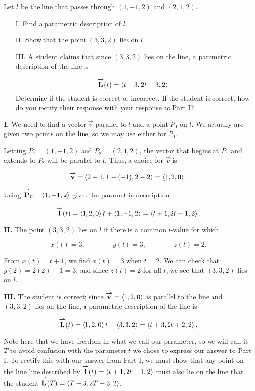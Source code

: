 \documentclass[noauthor, handout]{ximera}
\begin{document}

\begin{problem}
Let $l$ be the line that passes through $(1,-1,2)$ and $(2,1,2)$.

\begin{itemize}
\item[I.] Find a parametric description of $l$.
\item[II.] Show that the point $(3,3,2)$ lies on $l$.
\item[III.] A student claims that since $(3,3,2)$ lies on the line, a parametric description of the line is 

\[
{\overset{\boldsymbol{\rightharpoonup}}{\mathbf{L}}}(t) = \left\langle t+3,2t+3,2\right\rangle.
\]
Determine if the student is correct or incorrect.  If the student is correct, how do you rectify their response with your response to Part I?
\end{itemize} 

\begin{freeResponse}

\textbf{I.} We need to find a vector $\vec{v}$ parallel to $l$ and a point $P_0$ on $l$.  We actually are given two points on the line, so we may use either for $P_0$.  

Letting $P_1 = (1,-1,2)$ and $P_2 = (2,1,2)$, the vector that begins at $P_1$ and extends to $P_2$ will be parallel to $l$.  Thus, a choice for $\vec{v}$ is

\[
{\overset{\boldsymbol{\rightharpoonup}}{\mathbf{v}}} = \left\langle 2-1,1-(-1),2-2\right\rangle = \left\langle 1,2,0\right\rangle.
\]

Using ${\overset{\boldsymbol{\rightharpoonup}}{\mathbf{P}}}_0 = \left\langle 1,-1,2\right\rangle$ gives the parametric description

\[
{\overset{\boldsymbol{\rightharpoonup}}{\mathbf{l}}}(t) = \left\langle 1,2,0\right\rangle t+\left\langle 1,-1,2\right\rangle = \left\langle t+1,2t-1,2\right\rangle.
\]


\textbf{II.} The point $(3,3,2)$ lies on $l$ if there is a common $t$-value for which 

\[
x(t) = 3, \qquad \qquad y(t) =3, \qquad  \qquad z(t)=2.
\] 

From $x(t) =t+1$, we find $x(t) = 3$ when $t=2$.  We can check that $y(2) = 2(2)-1=3$, and since $z(t) = 2$ for all $t$, we see that $(3,3,2)$ lies on $l$.

\textbf{III.} The student is correct; since ${\overset{\boldsymbol{\rightharpoonup}}{\mathbf{v}}} = \left\langle 1,2,0\right\rangle$ is parallel to the line and $(3,3,2)$ lies on the line, a parametric description of the line is

\[
{\overset{\boldsymbol{\rightharpoonup}}{\mathbf{L}}}(t) =  \left\langle 1,2,0\right\rangle t+\left\langle 3,3,2\right\rangle = \left\langle t+3,2t+2,2\right\rangle.
\]

Note here that we have freedom in what we call our parameter, so we will call it $T$ to avoid confusion with the parameter $t$ we chose to express our answer to Part I.  To rectify this with our answer from Part I, we must show that any point on the line line described by ${\overset{\boldsymbol{\rightharpoonup}}{\mathbf{l}}}(t) = \left\langle t+1,2t-1,2\right\rangle$ must also lie on the line that the student ${\overset{\boldsymbol{\rightharpoonup}}{\mathbf{L}}}(T) = \left\langle T+3,2T+3,2\right\rangle$.


\end{freeResponse}
\end{problem}
\end{document}
